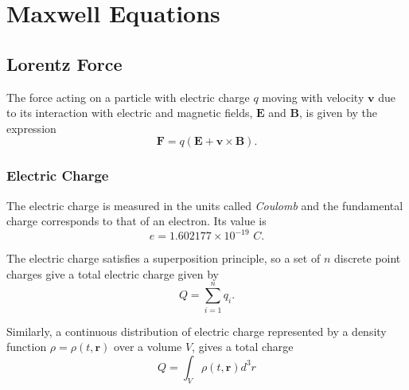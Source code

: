 \chapter{Maxwell Equations}

\section{Lorentz Force}
The force acting on a particle with electric charge $q$ moving with velocity $\textbf{v} $ due to its interaction with electric and magnetic fields, $\textbf{E}$ and $\textbf{B}$, is given by the expression
\begin{equation}
\textbf{F} = q \left( \textbf{E} +\textbf{v} \times \textbf{B} \right). 
\label{eq:LorentzForce}
\end{equation}

\subsection{Electric Charge}
The electric charge is measured in the units called \textit{Coulomb} and the fundamental charge corresponds to that of an electron. Its value is
\begin{equation}
 e = 1.602177 \times 10^{-19} \textit{ C}.
 \end{equation} 
 
The electric charge satisfies a superposition principle, so a set of $n$ discrete point charges give a total electric charge given by
\begin{equation}
Q = \sum_{i=1}^n q_i.
\end{equation}

Similarly, a continuous distribution of electric charge represented by a density function $\rho = \rho(t,\textbf{r})$ over a volume $V$, gives a total charge 
\begin{equation}
Q = \int_V \rho(t,\textbf{r}) d^3r
\end{equation}

